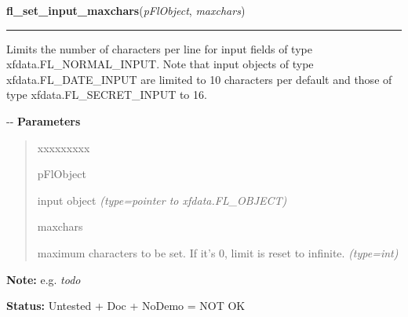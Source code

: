 \hspace{.8\funcindent}\begin{boxedminipage}{\funcwidth}

    \raggedright \textbf{fl\_set\_input\_maxchars}(\textit{pFlObject}, \textit{maxchars})

    \vspace{-1.5ex}

    \rule{\textwidth}{0.5\fboxrule}
\setlength{\parskip}{2ex}

Limits the number of characters per line for input fields of type
xfdata.FL\_NORMAL\_INPUT. Note that input objects of type
xfdata.FL\_DATE\_INPUT are limited to 10 characters per default and those
of type xfdata.FL\_SECRET\_INPUT to 16.

-{}-
\setlength{\parskip}{1ex}
      \textbf{Parameters}
      \vspace{-1ex}

      \begin{quote}
        \begin{Ventry}{xxxxxxxxx}

          \item[pFlObject]


input object
            {\it (type=pointer to xfdata.FL\_OBJECT)}

          \item[maxchars]


maximum characters to be set. If it's 0, limit is reset to infinite.
            {\it (type=int)}

        \end{Ventry}

      \end{quote}

\textbf{Note:} 
e.g. \emph{todo}


\textbf{Status:} 
Untested + Doc + NoDemo = NOT OK


    \end{boxedminipage}

    \label{xformslib:flinput:fl_set_input_format}

    \vspace{0.5ex}

